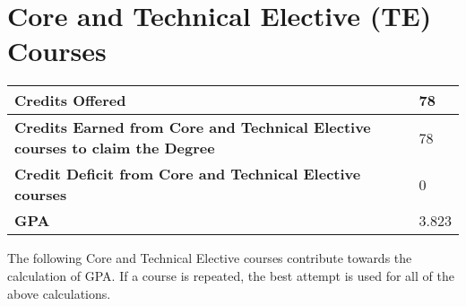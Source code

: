 \documentclass[12pt]{article}
\begin{document}
\section*{Core and Technical Elective (TE) Courses}

\begin{tabularx}{\textwidth}{|X|l|}
\hline 
\textbf{Credits Offered} & 78 \\ \hline 
\textbf{Credits Earned from Core and Technical Elective courses to claim the Degree} & 78 \\ \hline 
\textbf{Credit Deficit from Core and Technical Elective courses} & 0 \\
\hline 
\textbf{GPA} & 3.823 \\
\hline 
\end{tabularx}

\noindent The following Core and Technical Elective courses contribute towards the calculation of GPA. If a course is repeated, the best attempt is used for all of the above calculations.
\end{document}
